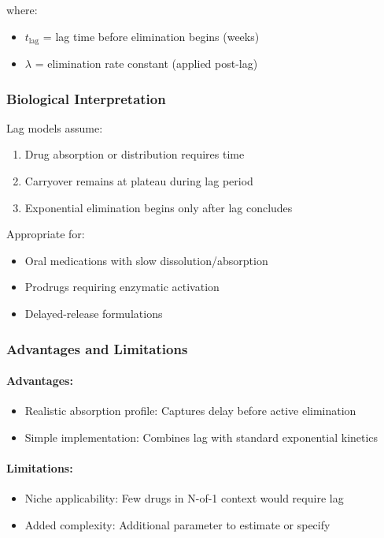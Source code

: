 \documentclass[11pt,a4paper]{article}
\begin{document}
where:
\begin{itemize}
  \item $t_{\text{lag}}$ = lag time before elimination begins (weeks)
  \item $\lambda$ = elimination rate constant (applied post-lag)
\end{itemize}

\subsubsection{Biological Interpretation}

Lag models assume:
\begin{enumerate}
  \item Drug absorption or distribution requires time
  \item Carryover remains at plateau during lag period
  \item Exponential elimination begins only after lag concludes
\end{enumerate}

Appropriate for:
\begin{itemize}
  \item Oral medications with slow dissolution/absorption
  \item Prodrugs requiring enzymatic activation
  \item Delayed-release formulations
\end{itemize}

\subsubsection{Advantages and Limitations}

\paragraph{Advantages:}
\begin{itemize}
  \item Realistic absorption profile: Captures delay before active elimination
  \item Simple implementation: Combines lag with standard exponential kinetics
\end{itemize}

\paragraph{Limitations:}
\begin{itemize}
  \item Niche applicability: Few drugs in N-of-1 context would require lag
  \item Added complexity: Additional parameter to estimate or specify
\end{itemize}
\end{document}
